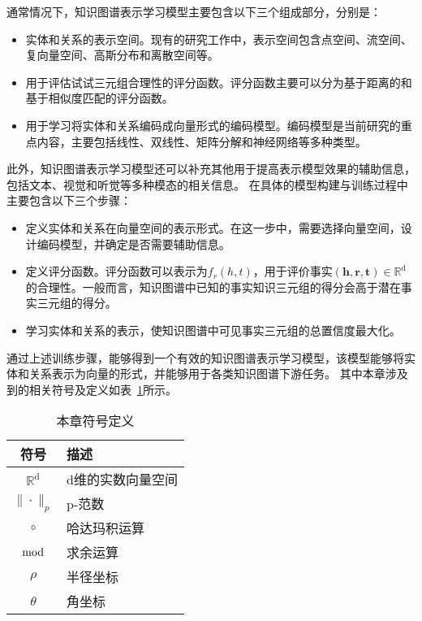 \documentclass[algorithmlist, AutoFakeBold, AutoFakeSlant, figurelist, tablelist, nomlist, masters]{seuthesix}
\begin{document}
通常情况下，知识图谱表示学习模型主要包含以下三个组成部分，分别是：
\begin{itemize}
  \item [(1)] 实体和关系的表示空间。现有的研究工作中，表示空间包含点空间、流空间、复向量空间、高斯分布和离散空间等。
  \item [(2)] 用于评估试试三元组合理性的评分函数。评分函数主要可以分为基于距离的和基于相似度匹配的评分函数。
  \item [(3)] 用于学习将实体和关系编码成向量形式的编码模型。编码模型是当前研究的重点内容，主要包括线性、双线性、矩阵分解和神经网络等多种类型。
\end{itemize}

此外，知识图谱表示学习模型还可以补充其他用于提高表示模型效果的辅助信息，包括文本、视觉和听觉等多种模态的相关信息。
在具体的模型构建与训练过程中主要包含以下三个步骤：
\begin{itemize}
  \item [(1)] 定义实体和关系在向量空间的表示形式。在这一步中，需要选择向量空间，设计编码模型，并确定是否需要辅助信息。
  \item [(2)] 定义评分函数。评分函数可以表示为$f_r(h, t)$，用于评价事实$\left(\bm{h}, \bm{r}, \bm{t}\right) \in \mathbb{R}^{\mathrm{d}}$的合理性。一般而言，知识图谱中已知的事实知识三元组的得分会高于潜在事实三元组的得分。
  \item [(3)] 学习实体和关系的表示，使知识图谱中可见事实三元组的总置信度最大化。
\end{itemize}

通过上述训练步骤，能够得到一个有效的知识图谱表示学习模型，该模型能够将实体和关系表示为向量的形式，并能够用于各类知识图谱下游任务。
其中本章涉及到的相关符号及定义如表~\ref{2_symbols}所示。
\begin{table}
  \centering
  \begin{tabular*}{0.4\textwidth}{@{\extracolsep{\fill}}cl}
		\toprule[1pt]
    符号 & 描述 \\ \hline
    $\mathbb{R}^{\mathrm{d}}$ & d维的实数向量空间\\
    $\|\cdot\|_{p}$ & p-范数\\
    $\circ$ & 哈达玛积运算\\
    $\bmod$ & 求余运算\\
    $\rho$ & 半径坐标\\
    $\theta$ & 角坐标\\
		\bottomrule[1pt]
	\end{tabular*}
  \caption{本章符号定义}
  \label{2_symbols}
\end{table}
\end{document}
